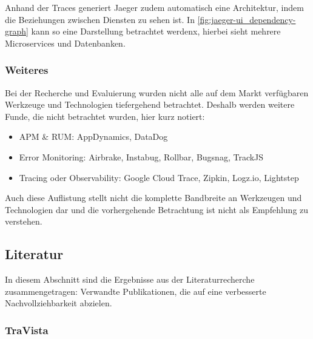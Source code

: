 Anhand der Traces generiert Jaeger zudem automatisch eine Architektur, indem die Beziehungen zwischen Diensten zu sehen ist. In \autoref{fig:jaeger-ui_dependency-graph} kann so eine Darstellung betrachtet werdenx, hierbei sieht mehrere Microservices und Datenbanken.

\subsubsection{Weiteres}
\label{sec:weitere-werkzeuge}

Bei der Recherche und Evaluierung wurden nicht alle auf dem Markt verfügbaren Werkzeuge und Technologien tiefergehend betrachtet. Deshalb werden weitere Funde, die nicht betrachtet wurden, hier kurz notiert:

\begin{itemize}
	\item APM \& RUM: AppDynamics, DataDog
	\item Error Monitoring: Airbrake, Instabug, Rollbar, Bugsnag, TrackJS
	\item Tracing oder Observability: Google Cloud Trace, Zipkin, Logz.io, Lightstep
\end{itemize}

Auch diese Auflistung stellt nicht die komplette Bandbreite an Werkzeugen und Technologien dar und die vorhergehende Betrachtung ist nicht als Empfehlung zu verstehen.

\subsection{Literatur}

In diesem Abschnitt sind die Ergebnisse aus der Literaturrecherche zusammengetragen: Verwandte Publikationen, die auf eine verbesserte Nachvollziehbarkeit abzielen.


\subsubsection{TraVista}

